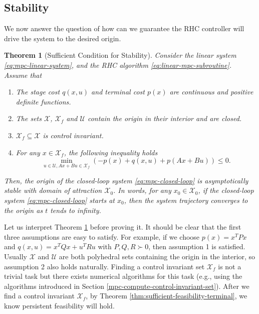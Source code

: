 \documentclass[
]{book}
\newtheorem{theorem}{Theorem}[chapter]
\theoremstyle{definition}
\theoremstyle{definition}
\theoremstyle{definition}
\theoremstyle{definition}
\theoremstyle{remark}
\begin{document}
\hypertarget{mpc-stability}{%
\subsection{Stability}\label{mpc-stability}}

We now answer the question of how can we guarantee the RHC controller will drive the system to the desired origin.

\begin{theorem}[Sufficient Condition for Stability]
\protect\hypertarget{thm:mpc-stability}{}\label{thm:mpc-stability}Consider the linear system \eqref{eq:mpc-linear-system}, and the RHC algorithm \eqref{eq:linear-mpc-subroutine}. Assume that

\begin{enumerate}
\def\labelenumi{\arabic{enumi}.}
\item
  The stage cost \(q(x,u)\) and terminal cost \(p(x)\) are continuous and positive definite functions.
\item
  The sets \(\mathcal{X}\), \(\mathcal{X}_f\) and \(\mathcal{U}\) contain the origin in their interior and are closed.
\item
  \(\mathcal{X}_f \subseteq \mathcal{X}\) is control invariant.
\item
  For any \(x \in \mathcal{X}_f\), the following inequality holds
  \begin{equation}
  \min_{u \in \mathcal{U}, A x + Bu \in \mathcal{X}_f} \left( - p(x) + q(x,u) + p(Ax + Bu) \right) \leq 0.
  \label{eq:mpc-stability-lyapunov}
  \end{equation}
\end{enumerate}

Then, the origin of the closed-loop system \eqref{eq:mpc-closed-loop} is asymptotically stable with domain of attraction \(\mathcal{X}_0\). In words, for any \(x_0 \in \mathcal{X}_0\), if the closed-loop system \eqref{eq:mpc-closed-loop} starts at \(x_0\), then the system trajectory converges to the origin as \(t\) tends to infinity.
\end{theorem}

Let us interpret Theorem \ref{thm:mpc-stability} before proving it. It should be clear that the first three assumptions are easy to satisfy. For example, if we choose \(p(x) = x^T P x\) and \(q(x,u) = x^T Q x + u^T R u\) with \(P, Q, R \succ 0\), then assumption 1 is satisfied. Usually \(\mathcal{X}\) and \(\mathcal{U}\) are both polyhedral sets containing the origin in the interior, so assumption 2 also holds naturally. Finding a control invariant set \(\mathcal{X}_f\) is not a trivial task but there exists numerical algorithms for this task (e.g., using the algorithms introduced in Section \ref{mpc-compute-control-invariant-set}). After we find a control invariant \(\mathcal{X}_f\), by Theorem \ref{thm:sufficient-feasibility-terminal}, we know persistent feasibility will hold.
\end{document}
